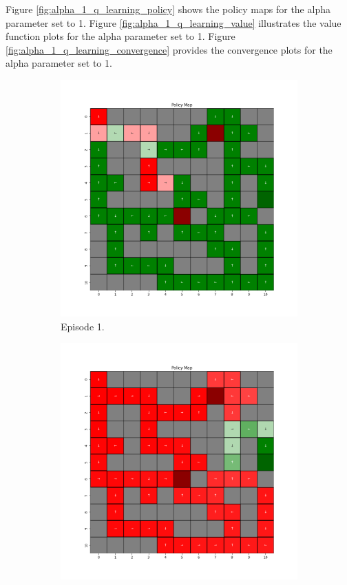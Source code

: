 \documentclass{assignment}
\begin{document}
Figure \ref{fig:alpha_1_q_learning_policy} shows the policy maps for the alpha parameter set to 1. Figure \ref{fig:alpha_1_q_learning_value} illustrates the value function plots for the alpha parameter set to 1. Figure \ref{fig:alpha_1_q_learning_convergence} provides the convergence plots for the alpha parameter set to 1.
\begin{figure}[H]
    \begin{subfigure}{0.3\textwidth}
        \includegraphics[width=\textwidth]{figures/policy_q/alpha_sweep/policy_alpha_1_gamma_0.95_epsilon_0.2_iteration_1.png}
    \caption{Episode 1.}
    \end{subfigure}\hfill
    \begin{subfigure}{0.3\textwidth}
        \includegraphics[width=\textwidth]{figures/policy_q/alpha_sweep/policy_alpha_1_gamma_0.95_epsilon_0.2_iteration_50.png}

\end{subfigure}
\end{figure}
\end{document}
